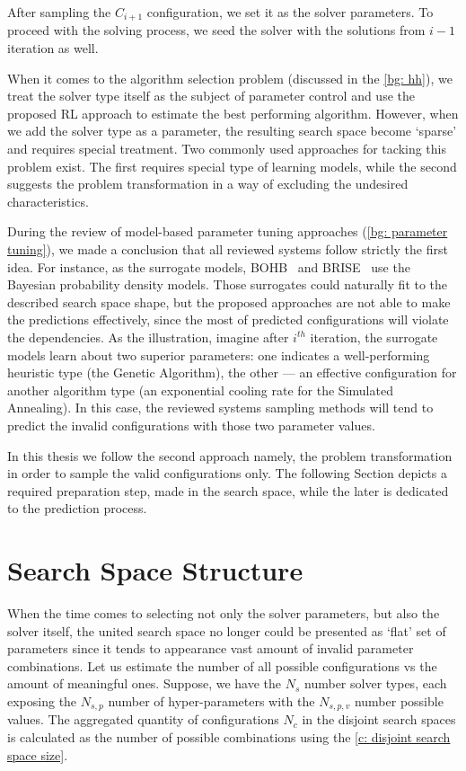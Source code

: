 After sampling the $C_{i+1}$ configuration, we set it as the solver parameters. To proceed with the solving process, we seed the solver with the solutions from $i-1$ iteration as well.

When it comes to the algorithm selection problem (discussed in the \cref{bg: hh}), we treat the solver type itself as the subject of parameter control and use the proposed RL approach to estimate the best performing algorithm. However, when we add the solver type as a parameter, the resulting search space become `sparse' and requires special treatment. Two commonly used approaches for tacking this problem exist. The first requires special type of learning models, while the second suggests the problem transformation in a way of excluding the undesired characteristics.

During the review of model-based parameter tuning approaches (\cref{bg: parameter tuning}), we made a conclusion that all reviewed systems follow strictly the first idea. For instance, as the surrogate models, BOHB~\cite{falkner2018bohb} and BRISE~\cite{brise2spl} use the Bayesian probability density models. Those surrogates could naturally fit to the described search space shape, but the proposed approaches are not able to make the predictions effectively, since the most of predicted configurations will violate the dependencies. As the illustration, imagine after $i^{th}$ iteration, the surrogate models learn about two superior parameters: one indicates a well-performing heuristic type (the Genetic Algorithm), the other — an effective configuration for another algorithm type (an exponential cooling rate for the Simulated Annealing). In this case, the reviewed systems sampling methods will tend to predict the invalid configurations with those two parameter values.

In this thesis we follow the second approach namely, the problem transformation in order to sample the valid configurations only. The following Section depicts a required preparation step, made in the search space, while the later is dedicated to the prediction process.


\section{Search Space Structure}\label{concept:search space}
When the time comes to selecting not only the solver parameters, but also the solver itself, the united search space no longer could be presented as `flat' set of parameters since it tends to appearance vast amount of invalid parameter combinations. Let us estimate the number of all possible configurations vs the amount of meaningful ones. Suppose, we have the $N_s$ number solver types, each exposing the $N_{s,p}$ number of hyper-parameters with the $N_{s,p,v}$ number possible values. The aggregated quantity of configurations $N_c$ in the disjoint search spaces is calculated as the number of possible combinations using the \cref{c: disjoint search space size}.

